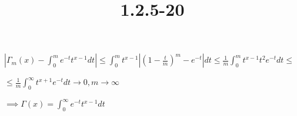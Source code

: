 \documentclass{article}
\title{1.2.5-20}
\begin{document}
\maketitle

$|\Gamma_m(x) - \int_0^m e^{-t}t^{x-1}dt| \leq \int_0^m t^{x-1}|(1-\frac{t}{m})^m - e^{-t}|dt \leq \frac{1}{m}\int_0^m t^{x-1}t^2e^{-t}dt \leq$

$\leq \frac{1}{m} \int_0^{\infty} t^{x+1}e^{-t}dt \to 0, m \to \infty$

$\implies \Gamma(x) = \int_0^{\infty} e^{-t}t^{x-1}dt$
\end{document}
